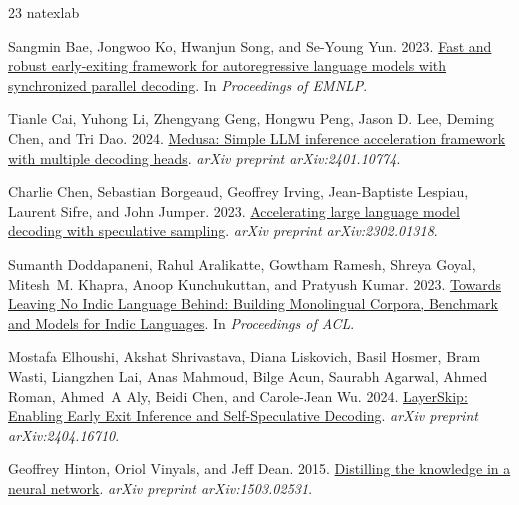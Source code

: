 \documentclass[11pt]{article}
\begin{document}
\begin{thebibliography}{23}
\expandafter\ifx\csname natexlab\endcsname\relax\def\natexlab#1{#1}\fi

Sangmin Bae, Jongwoo Ko, Hwanjun Song, and Se-Young Yun. 2023.
\newblock \href{https://arxiv.org/abs/2310.05424}{Fast and robust early-exiting framework for autoregressive language models with synchronized parallel decoding}.
\newblock In \emph{Proceedings of EMNLP}.

Tianle Cai, Yuhong Li, Zhengyang Geng, Hongwu Peng, Jason D. Lee, Deming Chen, and Tri Dao. 2024.
\newblock \href{https://arxiv.org/abs/2401.10774}{Medusa: Simple LLM inference acceleration framework with multiple decoding heads}.
\newblock \emph{arXiv preprint arXiv:2401.10774}.

Charlie Chen, Sebastian Borgeaud, Geoffrey Irving, Jean-Baptiste Lespiau, Laurent Sifre, and John Jumper. 2023.
\newblock \href{https://arxiv.org/abs/2302.01318}{Accelerating large language model decoding with speculative sampling}.
\newblock \emph{arXiv preprint arXiv:2302.01318}.

Sumanth Doddapaneni, Rahul Aralikatte, Gowtham Ramesh, Shreya Goyal, Mitesh~M. Khapra, Anoop Kunchukuttan, and Pratyush Kumar. 2023.
\newblock \href{https://huggingface.co/datasets/ai4bharat/IndicCorpV2/viewer/indiccorp_v2/hin_Deva}{Towards Leaving No Indic Language Behind: Building Monolingual Corpora, Benchmark and Models for Indic Languages}.
\newblock In \emph{Proceedings of ACL}.

Mostafa Elhoushi, Akshat Shrivastava, Diana Liskovich, Basil Hosmer, Bram Wasti, Liangzhen Lai, Anas Mahmoud, Bilge Acun, Saurabh Agarwal, Ahmed Roman, Ahmed~A Aly, Beidi Chen, and Carole-Jean Wu. 2024.
\newblock \href{https://arxiv.org/abs/2404.16710}{LayerSkip: Enabling Early Exit Inference and Self-Speculative Decoding}.
\newblock \emph{arXiv preprint arXiv:2404.16710}.

Geoffrey Hinton, Oriol Vinyals, and Jeff Dean. 2015.
\newblock \href{https://arxiv.org/abs/1503.02531}{Distilling the knowledge in a neural network}.
\newblock \emph{arXiv preprint arXiv:1503.02531}.


\end{thebibliography}
\end{document}
